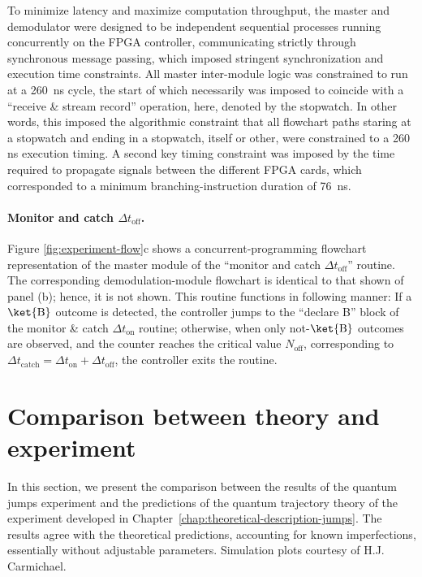 To minimize latency and maximize computation throughput, the master
and demodulator were designed to be independent sequential processes
running concurrently on the FPGA controller, communicating strictly
through synchronous message passing, which imposed stringent synchronization
and execution time constraints. All master inter-module logic was
constrained to run at a 260~ns cycle, the start of which necessarily
was imposed to coincide with a ``receive \& stream record'' operation,
here, denoted by the stopwatch. In other words, this imposed the algorithmic
constraint that all flowchart paths staring at a stopwatch and ending
in a stopwatch, itself or other, were constrained to a 260\,ns execution
timing. A second key timing constraint was imposed by the time required
to propagate signals between the different FPGA cards, which corresponded
to a minimum branching-instruction duration of 76~ns.

\paragraph{Monitor and catch $\Delta t_{\mathrm{off}}$.}

Figure \ref{fig:experiment-flow}c shows a concurrent-programming
flowchart representation of the master module of the ``monitor and
catch $\Delta t_{\mathrm{off}}$'' routine. The corresponding demodulation-module
flowchart is identical to that shown of panel (b); hence, it is not
shown. This routine functions in following manner: If a $\ket{\mathrm{B}}$
outcome is detected, the controller jumps to the ``declare B'' block
of the monitor \& catch $\Delta t_{\mathrm{on}}$ routine; otherwise,
when only not-$\ket{\mathrm{B}}$ outcomes are observed, and the counter
reaches the critical value $N_{\mathrm{off}}$, corresponding to $\Delta t_{\mathrm{catch}}=\Delta t_{\mathrm{on}}+\Delta t_{\mathrm{off}}$,
the controller exits the routine.

\section{Comparison between theory and experiment \label{subsec:Comparison-between-theory}\label{subsec:Error-analysis}}

In this section, we present the comparison between the results of
the quantum jumps experiment and the predictions of the quantum trajectory
theory of the experiment developed in Chapter~\ref{chap:theoretical-description-jumps}.
The results agree with the theoretical predictions, accounting for
known imperfections, essentially without adjustable parameters. Simulation
plots courtesy of H.J. Carmichael. 

